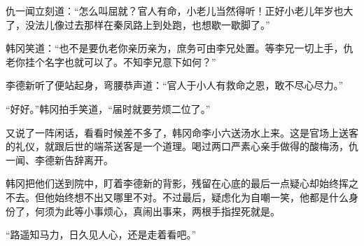 仇一闻立刻道：“怎么叫屈就？官人有命，小老儿当然得听！正好小老儿年岁也大了，没法儿像过去那样在秦凤路上到处跑，也想歇一歇脚了。”

韩冈笑道：“也不是要仇老你亲历亲为，庶务可由李兄处置。等李兄一切上手，仇老你挂个名字也就可以了。不知李兄意下如何？”

李德新听了便站起身，弯腰恭声道：“官人于小人有救命之恩，敢不尽心尽力。”

“好好。”韩冈拍手笑道，“届时就要劳烦二位了。”

又说了一阵闲话，看看时候差不多了，韩冈命李小六送汤水上来。这是官场上送客的礼仪，就跟后世的端茶送客是一个道理。喝过两口严素心亲手做得的酸梅汤，仇一闻、李德新告辞离开。

韩冈把他们送到院中，盯着李德新的背影，残留在心底的最后一点疑心却始终挥之不去。但他始终想不出又哪里不对。不过最后，疑虑化为自嘲一笑，他都是什么身份了，何须为此等小事烦心，真闹出事来，两根手指捏死就是。

“路遥知马力，日久见人心，还是走着看吧。”

